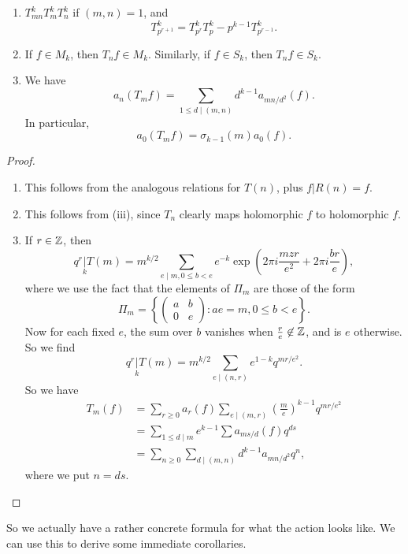 \documentclass[a4paper]{article}
\begin{document}
\begin{prop}\leavevmode
  \begin{enumerate}
    \item $T_{mn}^k T_m^k T_n^k$ if $(m, n) = 1$, and
      \[
        T_{p^{r + 1}}^k = T_{p^r}^k T_p^k - p^{k - 1} T_{p^{r - 1}}^k.
      \]
     \item If $f \in M_k$, then $T_n f \in M_k$. Similarly, if $f \in S_k$, then $T_n f \in S_k$.
     \item We have
       \[
         a_n (T_m f) = \sum_{1 \leq d \mid (m, n)} d^{k - 1}a_{mn/d^2} (f).
       \]
       In particular,
       \[
         a_0(T_m f) = \sigma_{k - 1}(m) a_0(f).
       \]
  \end{enumerate}
\end{prop}
\begin{proof}\leavevmode
  \begin{enumerate}
    \item This follows from the analogous relations for $T(n)$, plus $f|R(n) = f$.
    \item This follows from (iii), since $T_n$ clearly maps holomorphic $f$ to holomorphic $f$.
    \item If $r \in \mathbb{Z}$, then
      \[
        q^r \underset{k}{|} T(m) = m^{k/2} \sum_{e \mid m, 0 \leq b < e} e^{-k}\exp\left(2\pi i \frac{mzr }{e^2} + 2\pi i \frac{br}{e}\right),
      \]
      where we use the fact that the elements of $\Pi_m$ are those of the form
      \[
        \Pi_m = \left\{
          \begin{pmatrix}
            a & b\\
            0 & e
          \end{pmatrix} : ae = m, 0 \leq b < e
        \right\}.
      \]
      Now for each fixed $e$, the sum over $b$ vanishes when $\frac{r}{e} \not\in \mathbb{Z}$, and is $e$ otherwise. So we find
      \[
        q^r \underset{k}{|} T(m) = m^{k/2} \sum_{e \mid (n, r)} e^{1 - k} q^{mr/e^2}.
      \]
      So we have
      \begin{align*}
        T_m(f) &= \sum_{r \geq 0} a_r(f) \sum_{e \mid (m, r)} \left(\frac{m}{e}\right)^{k - 1} q^{mr/e^2} \\
        &= \sum_{1 \leq d \mid m} e^{k - 1} \sum a_{ms/d} (f) q^{ds} \\
        &= \sum_{n \geq 0} \sum_{d \mid (m, n)} d^{k - 1} a_{mn/d^2} q^n,
      \end{align*}
      where we put $n = ds$.\qedhere
  \end{enumerate}
\end{proof}
So we actually have a rather concrete formula for what the action looks like. We can use this to derive some immediate corollaries.
\end{document}

